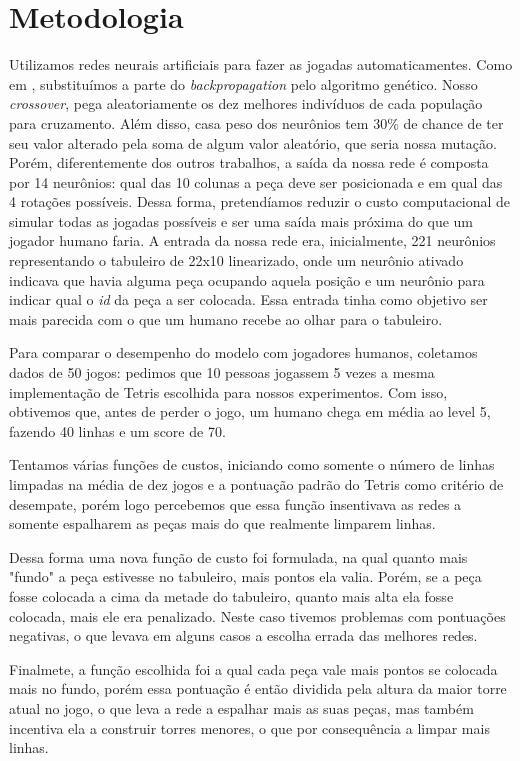 \documentclass[conference]{IEEEtran}
\begin{document}
\section{Metodologia}
Utilizamos redes neurais artificiais para fazer as jogadas automaticamentes. Como em \cite{b8}, substituímos a parte do \textit{backpropagation} pelo algoritmo genético. Nosso \textit{crossover}, pega aleatoriamente os dez melhores indivíduos de cada população para cruzamento. Além disso, casa peso dos neurônios tem 30\% de chance de ter seu valor alterado pela soma de algum valor aleatório, que seria nossa mutação.   Porém, diferentemente dos outros trabalhos, a saída da nossa rede é composta por 14 neurônios: qual das 10 colunas a peça deve ser posicionada e em qual das 4 rotações possíveis. Dessa forma, pretendíamos reduzir o custo computacional de simular todas as jogadas possíveis e ser uma saída mais próxima do que um jogador humano faria. A entrada da nossa rede era, inicialmente, 221 neurônios representando o tabuleiro de 22x10 linearizado, onde um neurônio ativado indicava que havia alguma peça ocupando aquela posição e um neurônio para indicar qual o \textit{id} da peça a ser colocada. Essa entrada tinha como objetivo ser mais parecida com o que um humano recebe ao olhar para o tabuleiro.

Para comparar o desempenho do modelo com jogadores humanos, coletamos dados de 50 jogos: pedimos que 10 pessoas jogassem 5 vezes a mesma implementação de Tetris escolhida para nossos experimentos. Com isso, obtivemos que, antes de perder o jogo, um humano chega em média ao level 5, fazendo 40 linhas e um score de 70.

Tentamos várias funções de custos, iniciando como somente o número de linhas limpadas na média de dez jogos e a pontuação padrão do Tetris como critério de desempate, porém logo percebemos que essa função insentivava as redes a somente espalharem as peças mais do que realmente limparem linhas.

Dessa forma uma nova função de custo foi formulada, na qual quanto mais "fundo" a peça estivesse no tabuleiro, mais pontos ela valia. Porém, se a peça fosse colocada a cima da metade do tabuleiro, quanto mais alta ela fosse colocada, mais ele era penalizado. Neste caso tivemos problemas com pontuações negativas, o que levava em alguns casos a escolha errada das melhores redes.

Finalmete, a função escolhida foi a qual cada peça vale mais pontos se colocada mais no fundo, porém essa pontuação é então dividida pela altura da maior torre atual no jogo, o que leva a rede a espalhar mais as suas peças, mas também incentiva ela a construir torres menores, o que por consequência a limpar mais linhas.
\end{document}

